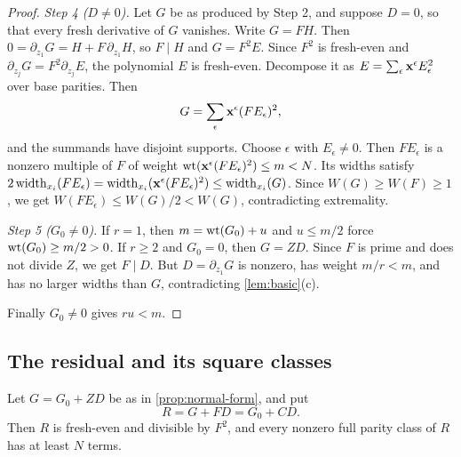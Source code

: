 \begin{proof}
\emph{Step 4 ($D\ne0$).} Let $G$ be as produced by Step 2, and suppose $D=0$, so that every fresh derivative of $G$ vanishes. Write $G=FH$. Then $0=\partial_{z_1}G=H+F\,\partial_{z_1}H$, so $F\mid H$ and $G=F^2E$. Since $F^2$ is fresh-even and $\partial_{z_j}G=F^2\partial_{z_j}E$, the polynomial $E$ is fresh-even. Decompose it as $E=\sum_{\epsilon}\mathbf{x}^{\epsilon}E_\epsilon^2$ over base parities. Then
\[
 G=\sum_\epsilon \mathbf{x}^\epsilon (FE_\epsilon)^2,
\]
and the summands have disjoint supports. Choose $\epsilon$ with $E_\epsilon\ne0$. Then $FE_\epsilon$ is a nonzero multiple of $F$ of weight $\operatorname{wt}(\mathbf{x}^\epsilon(FE_\epsilon)^2)\le m<N$. Its widths satisfy $2\operatorname{width}_{x_i}(FE_\epsilon)=\operatorname{width}_{x_i}(\mathbf{x}^\epsilon(FE_\epsilon)^2)\le\operatorname{width}_{x_i}(G)$. Since $W(G)\ge W(F)\ge1$, we get $W(FE_\epsilon)\le W(G)/2<W(G)$, contradicting extremality.

\emph{Step 5 ($G_0\ne0$).} If $r=1$, then $m=\operatorname{wt}(G_0)+u$ and $u\le m/2$ force $\operatorname{wt}(G_0)\ge m/2>0$. If $r\ge2$ and $G_0=0$, then $G=ZD$. Since $F$ is prime and does not divide $Z$, we get $F\mid D$. But $D=\partial_{z_1}G$ is nonzero, has weight $m/r<m$, and has no larger widths than $G$, contradicting \cref{lem:basic}(c).

Finally $G_0\ne0$ gives $ru<m$.
\end{proof}

\subsection{The residual and its square classes}

\begin{proposition}\label{prop:residual}
Let $G=G_0+ZD$ be as in \cref{prop:normal-form}, and put
\[
 R=G+FD=G_0+CD.
\]
Then $R$ is fresh-even and divisible by $F^2$, and every nonzero full parity class of $R$ has at least $N$ terms.
\end{proposition}

